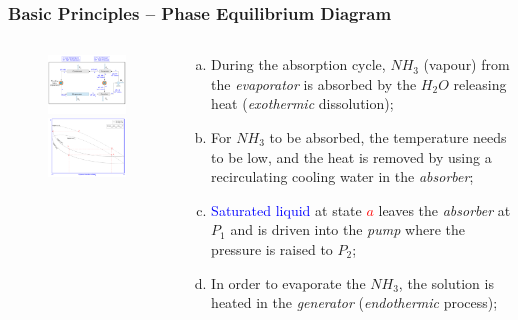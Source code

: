 \documentclass[10pt,compress]{beamer}
\begin{document}
\begin{frame}
 \frametitle{Basic Principles -- Phase Equilibrium Diagram} 
  \begin{columns}
   \begin{column}[c]{0.45\linewidth}
    \begin{figure}%
     \vbox{
      \includegraphics[width=4.5cm,height=4.cm,clip]{./Pics/Overview_Refrig32}
      \vspace{-.5cm}
      \includegraphics[width=4.5cm,height=4.cm,clip]{./Pics/Overview_Refrig34}}
    \end{figure}  
   \end{column}  
   \begin{column}[c]{0.55\linewidth}
    \begin{enumerate}[(a)]
     \item <1-> During the absorption cycle, $NH_{3}$ (vapour) from the {\it evaporator} is absorbed by the $H_{2}O$ releasing heat ({\it exothermic} dissolution);
     \item <2-> For $NH_{3}$ to be absorbed, the temperature needs to be low, and the heat is removed by using a recirculating cooling water in the {\it absorber};
     \item <3-> \textcolor{blue}{Saturated liquid} at state \textcolor{red}{$a$} leaves the {\it absorber} at $P_{1}$ and is driven into the {\it pump} where the pressure is raised to $P_{2}$;
     \item <4-> In order to evaporate the $NH_{3}$, the solution is heated in the {\it generator} ({\it endothermic} process);
   \end{enumerate}
  \end{column}  
 \end{columns}  
\end{frame}
\end{document}
